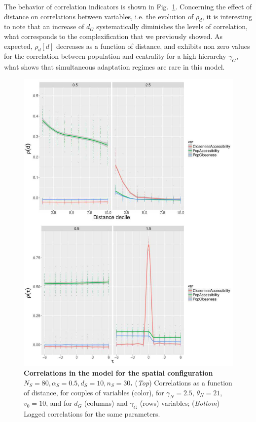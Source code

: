 The behavior of correlation indicators is shown in Fig.~\ref{fig:macrocoevolexplo:correlations}. Concerning the effect of distance on correlations between variables, i.e. the evolution of $\rho_d$, it is interesting to note that an increase of $d_G$ systematically diminishes the levels of correlation, what corresponds to the complexification that we previously showed. As expected, $\rho_d\left[d\right]$ decreases as a function of distance, and exhibits non zero values for the correlation between population and centrality for a high hierarchy $\gamma_G$, what shows that simultaneous adaptation regimes are rare in this model.


\begin{figure}
\includegraphics[width=\linewidth,height=0.9\textheight]{figures/6-1-3-fig-macrocoevolexplo-correlations.jpg}
	\caption{\textbf{Correlations in the model for the spatial configuration $N_S=80,\alpha_S=0.5,d_S=10,n_S=30$.} (\textit{Top}) Correlations as a function of distance, for couples of variables (color), for $\gamma_N = 2.5$, $\theta_N = 21$, $v_0 = 10$, and for $d_G$ (columns) and $\gamma_G$ (rows) variables; (\textit{Bottom}) Lagged correlations for the same parameters. \label{fig:macrocoevolexplo:correlations}}
\end{figure}

